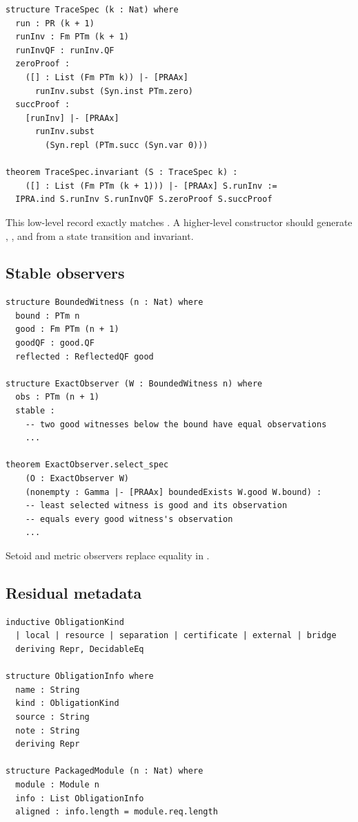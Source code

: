 \begin{lstlisting}[language={}]
structure TraceSpec (k : Nat) where
  run : PR (k + 1)
  runInv : Fm PTm (k + 1)
  runInvQF : runInv.QF
  zeroProof :
    ([] : List (Fm PTm k)) |- [PRAAx]
      runInv.subst (Syn.inst PTm.zero)
  succProof :
    [runInv] |- [PRAAx]
      runInv.subst
        (Syn.repl (PTm.succ (Syn.var 0)))

theorem TraceSpec.invariant (S : TraceSpec k) :
    ([] : List (Fm PTm (k + 1))) |- [PRAAx] S.runInv :=
  IPRA.ind S.runInv S.runInvQF S.zeroProof S.succProof
\end{lstlisting}

This low-level record exactly matches .  A higher-level
constructor should generate , , and
 from a state transition and invariant.

\subsection{Stable observers}

\begin{lstlisting}[language={}]
structure BoundedWitness (n : Nat) where
  bound : PTm n
  good : Fm PTm (n + 1)
  goodQF : good.QF
  reflected : ReflectedQF good

structure ExactObserver (W : BoundedWitness n) where
  obs : PTm (n + 1)
  stable :
    -- two good witnesses below the bound have equal observations
    ...

theorem ExactObserver.select_spec
    (O : ExactObserver W)
    (nonempty : Gamma |- [PRAAx] boundedExists W.good W.bound) :
    -- least selected witness is good and its observation
    -- equals every good witness's observation
    ...
\end{lstlisting}

Setoid and metric observers replace equality in .

\subsection{Residual metadata}

\begin{lstlisting}[language={}]
inductive ObligationKind
  | local | resource | separation | certificate | external | bridge
  deriving Repr, DecidableEq

structure ObligationInfo where
  name : String
  kind : ObligationKind
  source : String
  note : String
  deriving Repr

structure PackagedModule (n : Nat) where
  module : Module n
  info : List ObligationInfo
  aligned : info.length = module.req.length
\end{lstlisting}


